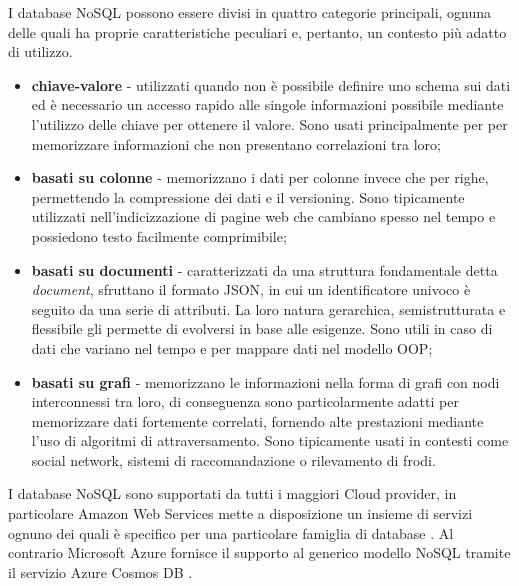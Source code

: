 I database NoSQL possono essere divisi in quattro categorie principali, ognuna delle quali ha proprie caratteristiche peculiari e, pertanto, un contesto più adatto di utilizzo.

\begin{itemize}
    \item \textbf{chiave-valore} - utilizzati quando non è possibile definire uno schema sui dati ed è necessario un accesso rapido alle singole informazioni possibile mediante l'utilizzo delle chiave per ottenere il valore. Sono usati principalmente per per memorizzare informazioni che non presentano correlazioni tra loro;
    \item \textbf{basati su colonne} - memorizzano i dati per colonne invece che per righe, permettendo la compressione dei dati e il versioning. Sono tipicamente utilizzati nell’indicizzazione di pagine web che cambiano spesso nel tempo e possiedono testo facilmente comprimibile;
    \item \textbf{basati su documenti} - caratterizzati da una struttura fondamentale detta \textit{document}, sfruttano il formato JSON, in cui un identificatore univoco è seguito da una serie di attributi. La loro natura gerarchica, semistrutturata e flessibile gli permette di evolversi in base alle esigenze. Sono utili in caso di dati che variano nel tempo e per mappare dati nel modello OOP;
    \item \textbf{basati su grafi} - memorizzano le informazioni nella forma di grafi con nodi interconnessi tra loro, di conseguenza sono particolarmente adatti per memorizzare dati fortemente correlati, fornendo alte prestazioni mediante l'uso di algoritmi di attraversamento. Sono tipicamente usati in contesti come social network, sistemi di raccomandazione o rilevamento di frodi.
\end{itemize}

I database NoSQL sono supportati da tutti i maggiori Cloud provider, in particolare Amazon Web Services mette a disposizione un insieme di servizi ognuno dei quali è specifico per una particolare famiglia di database \cite{AwsDb}. Al contrario Microsoft Azure fornisce il supporto al generico modello NoSQL tramite il servizio Azure Cosmos DB \cite{Cosmos}.

